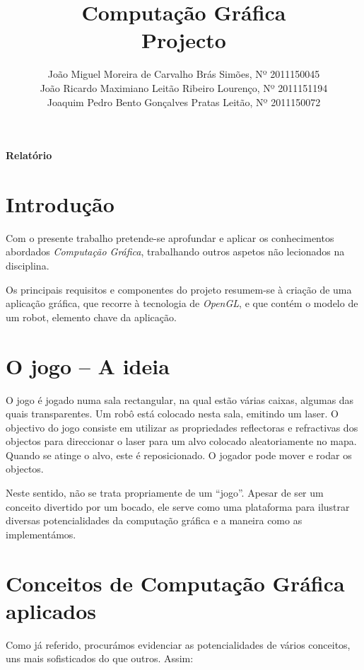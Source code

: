 \documentclass[11pt,a4paper]{article}
\title{\bf{Computação Gráfica}\vspace{50mm}\\Projecto\vspace{80mm}}
\author{
João Miguel Moreira de Carvalho Brás Simões, Nº 2011150045\\
João Ricardo Maximiano Leitão Ribeiro Lourenço, Nº 2011151194\\
Joaquim Pedro Bento Gonçalves Pratas Leitão, Nº 2011150072}
\begin{document}
\maketitle
\centerline{\textbf{Relatório}}
\pagebreak

\printindex

\pagebreak

\section{Introdução}

Com o presente trabalho pretende-se aprofundar e aplicar os conhecimentos abordados \emph{Computação Gráfica}, trabalhando outros aspetos não lecionados na disciplina.

Os principais requisitos e componentes do projeto resumem-se à criação de uma aplicação gráfica, que recorre à tecnologia de \emph{OpenGL}, e que contém o modelo de um robot, elemento chave da aplicação.

\section{O jogo -- A ideia}
O jogo é jogado numa sala rectangular, na qual estão várias caixas, algumas das quais transparentes. Um robô está colocado nesta sala, emitindo um laser. O objectivo do jogo consiste em utilizar as propriedades reflectoras e refractivas dos objectos para direccionar o laser para um alvo colocado aleatoriamente no mapa. Quando se atinge o alvo, este é reposicionado. O jogador pode mover e rodar os objectos.

Neste sentido, não se trata propriamente de um ``jogo''. Apesar de ser um conceito divertido por um bocado, ele serve como uma plataforma para ilustrar diversas potencialidades da computação gráfica e a maneira como as implementámos.

\section{Conceitos de Computação Gráfica aplicados}

Como já referido, procurámos evidenciar as potencialidades de vários conceitos, uns mais sofisticados do que outros. Assim:
\end{document}
